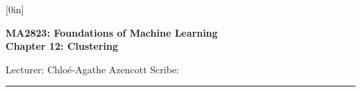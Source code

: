 \documentclass[a4paper,12pt]{article}
\begin{document}
\raisebox{0.6in}[0in]{}
\vspace{-0.7in}

\begin{center}
\bf\large MA2823: Foundations of Machine Learning \\
Chapter 12: Clustering
\end{center}

\noindent
Lecturer: Chlo\'e-Agathe Azencott   
\hfill
Scribe: 

\noindent
\rule{\textwidth}{1pt}

\medskip

\end{document}
